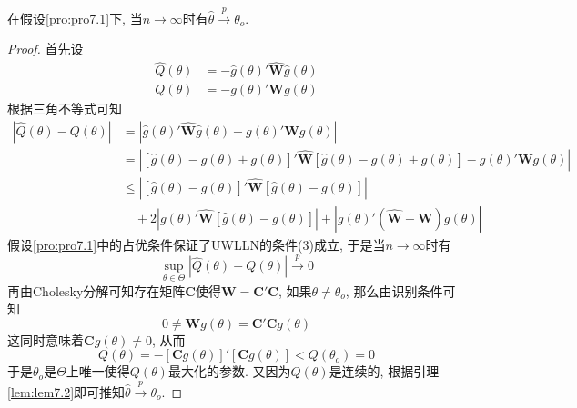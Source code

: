 \documentclass[cn, 12pt, math=mtpro2, bibstyle=apa, blue, twocol]{elegantbook}
\newcommand{\W}{\mathbold{W}}
\begin{document}
\begin{theorem}\label{thm:thm7.2}
  在假设\ref{pro:pro7.1}下, 当$n\to\infty$时有$\hat{\theta}\xrightarrow{p}\theta_o$.
\end{theorem}
\begin{proof}
  首先设
  \begin{align*}
  \hat{Q}(\theta)&=-\hat{g}(\theta)'\hat{\W}\hat{g}(\theta) \\
  Q(\theta)&=-g(\theta)'\W g(\theta)
  \end{align*}
  根据三角不等式可知
  \begin{align*}
  |\hat{Q}(\theta)-Q(\theta)|&=|\hat{g}(\theta)'\hat{\W}\hat{g}(\theta)-g(\theta)'\W g(\theta)| \\
  &=|[\hat{g}(\theta)-g(\theta)+g(\theta)]'\hat{\W}[\hat{g}(\theta)-g(\theta)+g(\theta)]-g(\theta)'\W g(\theta)| \\
  &\leq |[\hat{g}(\theta)-g(\theta)]'\hat{\W}[\hat{g}(\theta)-g(\theta)]| \\
  &\quad +2|g(\theta)'\hat{\W}[\hat{g}(\theta)-g(\theta)]|+|g(\theta)'(\hat{\W}-\W)g(\theta)|
  \end{align*}
  假设\ref{pro:pro7.1}中的占优条件保证了UWLLN的条件(3)成立, 于是当$n\to\infty$时有
  $$\sup_{\theta\in\Theta}|\hat{Q}(\theta)-Q(\theta)|\xrightarrow{p}0$$
  再由Cholesky分解可知存在矩阵$\mathbold{C}$使得$\W=\mathbold{C}'\mathbold{C}$, 如果$\theta\neq\theta_o$, 那么由识别条件可知
  $$0\neq \W g(\theta)=\mathbold{C}'\mathbold{C}g(\theta)$$
  这同时意味着$\mathbold{C}g(\theta)\neq0$, 从而
  $$Q(\theta)=-[\mathbold{C}g(\theta)]'[\mathbold{C}g(\theta)]<Q(\theta_o)=0$$
  于是$\theta_o$是$\Theta$上唯一使得$Q(\theta)$最大化的参数. 又因为$Q(\theta)$是连续的, 根据引理\ref{lem:lem7.2}即可推知$\hat{\theta}\xrightarrow{p}\theta_o$.
\end{proof}
\end{document}
